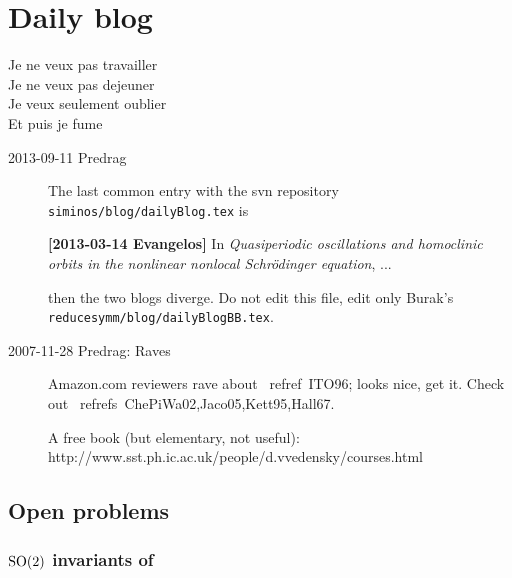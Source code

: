 
\chapter{Daily blog}
\label{c-DailyBlog}

\begin{bartlett}{
Je ne veux pas travailler\\
Je ne veux pas dejeuner\\
Je veux seulement oublier\\
Et puis je fume
            }
\end{bartlett}



\begin{description}
\item[2013-09-11  Predrag] The last common entry with the svn repository 
\\    \texttt{siminos/blog/dailyBlog.tex} is

{\bf [2013-03-14 Evangelos]} In
\emph{Quasiperiodic oscillations and homoclinic orbits in the nonlinear nonlocal
Schr\"odinger equation}, ...

then the two blogs diverge. Do not edit this file, edit only Burak's
\\ \texttt{reducesymm/blog/dailyBlogBB.tex}.


\item[2007-11-28 Predrag: Raves]
Amazon.com reviewers rave about ~refref~{ITO96};
looks nice, get it.
Check out
~refrefs~{ChePiWa02,Jaco05,Kett95,Hall67}.

A free book (but elementary, not useful):
\\
http://www.sst.ph.ic.ac.uk/people/d.vvedensky/courses.html

\end{description}

\section{Open problems}
\label{sect:open}

\subsection{$\textrm{SO}(2)$ invariants of \cLe}
\label{sect:invariants}

